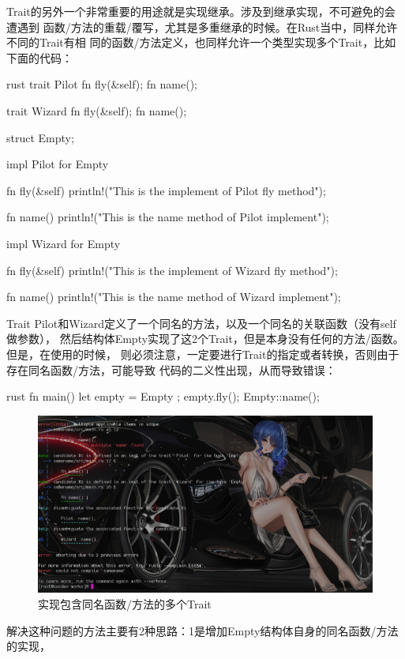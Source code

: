 Trait的另外一个非常重要的用途就是实现继承。涉及到继承实现，不可避免的会遭遇到
函数/方法的重载/覆写，尤其是多重继承的时候。在Rust当中，同样允许不同的Trait有相
同的函数/方法定义，也同样允许一个类型实现多个Trait，比如下面的代码：
\begin{code-block}{rust}
trait Pilot {
    fn fly(&self);
    fn name();
}

trait Wizard {
    fn fly(&self);
    fn name();
}

struct Empty;

impl Pilot for Empty {
    fn fly(&self) {
        println!("This is the implement of Pilot fly method");
    }

    fn name() {
        println!("This is the name method of Pilot implement");
    }
}

impl Wizard for Empty {
    fn fly(&self) {
        println!("This is the implement of Wizard fly method");
    }

    fn name() {
        println!("This is the name method of Wizard implement");
    }
}
\end{code-block}
Trait Pilot和Wizard定义了一个同名的方法，以及一个同名的关联函数（没有self做参数），
然后结构体Empty实现了这2个Trait，但是本身没有任何的方法/函数。但是，在使用的时候，
则必须注意，一定要进行Trait的指定或者转换，否则由于存在同名函数/方法，可能导致
代码的二义性出现，从而导致错误：
\begin{code-block}{rust}
fn main() {
    let empty = Empty {};
    empty.fly();
    Empty::name();
}
\end{code-block}
\begin{figure}[H]
  \centering
  \includegraphics[width=\linewidth]{rust_same_name.png}
  \caption{实现包含同名函数/方法的多个Trait}
  \label{fig:rust_same_name}
\end{figure}
解决这种问题的方法主要有2种思路：1是增加Empty结构体自身的同名函数/方法的实现，
